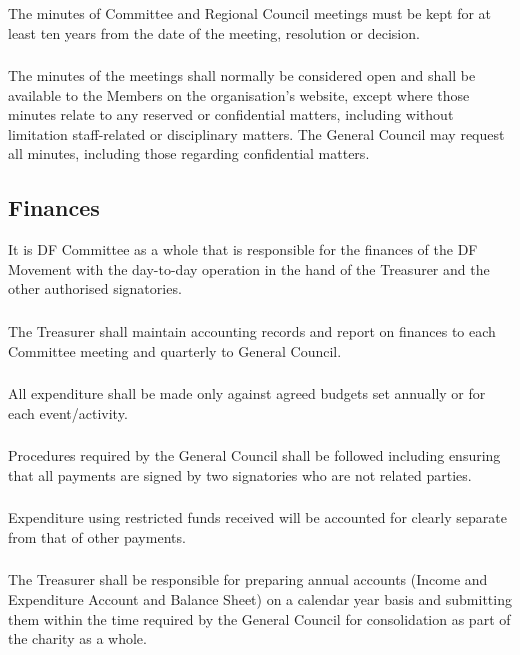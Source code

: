 \documentclass[a4paper, 12pt]{report}
\begin{document}
\subsubsection{}
The minutes of Committee and Regional Council meetings must be kept for at least ten years from the date of the meeting, resolution or decision.
\subsubsection{}
The minutes of the meetings shall normally be considered open and shall be available to the Members on the organisation's website, except where those minutes relate to any reserved or confidential matters, including without limitation staff-related or disciplinary matters. The General Council may request all minutes, including those regarding confidential matters.

\subsection{Finances}
It is DF Committee as a whole that is responsible for the finances of the DF Movement with
the day-to-day operation in the hand of the Treasurer and the other authorised signatories.
\subsubsection{}
The Treasurer shall maintain accounting records and report on finances to each Committee meeting and quarterly to General Council.
\subsubsection{}
All expenditure shall be made only against agreed budgets set annually or for each event/activity.
\subsubsection{}
Procedures required by the General Council shall be followed including ensuring that all payments are signed by two signatories who are not related parties.
\subsubsection{}
Expenditure using restricted funds received will be accounted for clearly separate from that of other payments.
\subsubsection{}
The Treasurer shall be responsible for preparing annual accounts (Income and Expenditure Account and Balance Sheet) on a calendar year basis and submitting them within the time required by the General Council for consolidation as part of the charity as a whole.
\end{document}
